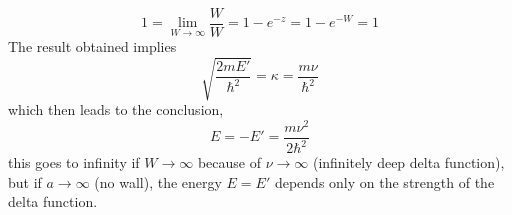 \documentclass{article}
\theoremstyle{definition}
\theoremstyle{remark}
\begin{document}
\begin{equation*}
    1 = \lim_{W\rightarrow\infty}\frac{W}{W} = 1 - e^{-z} = 1 - e^{-W} = 1
\end{equation*}
The result obtained implies
\begin{equation*}
    \sqrt{{\frac{2mE'}{\hbar^2}}} = \kappa = \frac{m\nu}{\hbar^2}
\end{equation*}
which then leads to the conclusion,
\begin{equation}
    \label{eq:ground state energy}
    E = -E' = \frac{m\nu^2}{2\hbar^2}
\end{equation} 
this goes to infinity if $W\rightarrow\infty$ because of $\nu\rightarrow\infty$ (infinitely deep delta function), but if $a\rightarrow\infty$ (no wall), the energy $E = E'$ depends only on the strength of the delta function.\\
\end{document}
